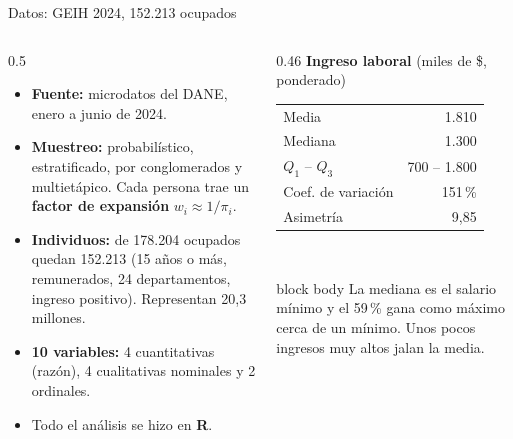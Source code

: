 \documentclass[aspectratio=169,11pt]{beamer}
\newenvironment{caja}{\begin{beamercolorbox}[sep=5pt]{block body}}{\end{beamercolorbox}}
\begin{document}
\begin{frame}{Datos: GEIH 2024, 152.213 ocupados}
  \begin{columns}[T]
    \begin{column}{0.5\textwidth}
      \small
      \begin{itemize}
        \item \textbf{Fuente:} microdatos del DANE, enero a junio de 2024.
        \item \textbf{Muestreo:} probabilístico, estratificado, por conglomerados y multietápico. Cada persona trae un \textbf{factor de expansión} $w_i\approx 1/\pi_i$.
        \item \textbf{Individuos:} de 178.204 ocupados quedan 152.213 (15 años o más, remunerados, 24 departamentos, ingreso positivo). Representan 20,3 millones.
        \item \textbf{10 variables:} 4 cuantitativas (razón), 4 cualitativas nominales y 2 ordinales.
        \item Todo el análisis se hizo en \textbf{R}.
      \end{itemize}
    \end{column}
    \begin{column}{0.46\textwidth}
      \centering
      {\small\textbf{Ingreso laboral} (miles de \$, ponderado)}\\[0.2cm]
      \small
      \begin{tabular}{@{}lr@{}}
        \toprule
        Media            & 1.810 \\
        Mediana          & 1.300 \\
        $Q_1$ -- $Q_3$   & 700 -- 1.800 \\
        Coef. de variación & 151\,\% \\
        Asimetría        & 9,85 \\
        \bottomrule
      \end{tabular}\\[0.3cm]
      \begin{caja}
        \footnotesize La mediana es el salario mínimo y el 59\,\% gana como máximo cerca de un mínimo. Unos pocos ingresos muy altos jalan la media.
      \end{caja}
    \end{column}
  \end{columns}
\end{frame}
\end{document}
